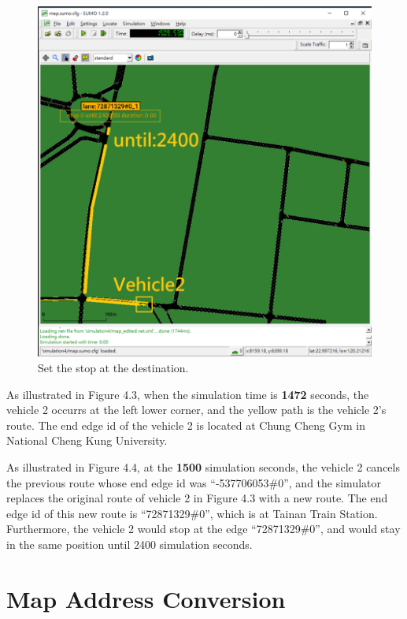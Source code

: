 \documentclass[12pt]{ksthesis}
\begin{document}
\begin{thesis}
{\begin{figure}[H]
\centering
\includegraphics[scale=0.6]{./Thesis_figures/F4-4_setStop.PNG}
\caption{\large Set the stop at the destination.}
\vspace{0.2cm}
\label{Fig:Set_stop}
\end{figure}

As illustrated in Figure 4.3, when the simulation time is \textbf{1472} seconds, the vehicle 2 occurrs at the left lower corner, and the yellow path is the vehicle 2’s route. 
The end edge id of the vehicle 2 is located at Chung Cheng Gym in National Cheng Kung University.


As illustrated in Figure 4.4, at the \textbf{1500} simulation seconds, the vehicle 2 cancels the previous route whose end edge id was “-537706053\#0”, and the simulator replaces the original route of vehicle 2 in Figure 4.3 with a new route. The end edge id of this new route is “72871329\#0”, which is at Tainan Train Station. Furthermore, the vehicle 2 would stop at the edge “72871329\#0”, and would stay in the same position until 2400 simulation seconds.



\section{Map Address Conversion}

}
\end{thesis}
\end{document}
